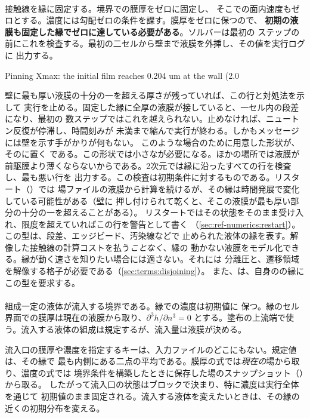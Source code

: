 \paragraph{} 接触線を縁に固定する。境界での膜厚をゼロに固定し、
そこでの面内速度もゼロとする。濃度には勾配ゼロの条件を課す。膜厚をゼロに保つので、
\textbf{初期の液膜も固定した縁でゼロに達している必要がある}。ソルバーは最初の
ステップの前にこれを検査する。最初の二セルから壁まで液膜を外挿し、その値を実行ログに
出力する。
\begin{plain}
Pinning Xmax: the initial film reaches 0.204 um at the wall (2.0 %
\end{plain}
壁に最も厚い液膜の十分の一を超える厚さが残っていれば、この行と対処法を示して
実行を止める。固定した縁に全厚の液膜が接していると、一セル内の段差になり、最初の
数ステップではこれを越えられない。止めなければ、ニュートン反復が停滞し、時間刻みが
未満まで縮んで実行が終わる。しかもメッセージには壁を示す手がかりが何もない。
このような場合のために用意した形状が、そのに置く
である。この形状では小さなが必要になる。ほかの場所では液膜が
前駆膜より薄くならないからである。2次元では縁に沿ったすべての行を検査し、最も悪い行を
出力する。この検査は初期条件に対するものである。リスタート（）では
場ファイルの液膜から計算を続けるが、その縁は時間発展で変化している可能性がある（壁に
押し付けられて乾くと、そこの液膜が最も厚い部分の十分の一を超えることがある）。
リスタートではその状態をそのまま受け入れ、限度を超えていればこの行を警告として書く
（\cref{sec:ref-numerics:restart}）。この型は、段差、エッジビード、汚染線などで
止められた液体の縁を表す。解像した接触線の計算コストを払う\emph{ことなく}、縁の
動かない液膜をモデル化できる。縁が動く速さを知りたい場合には適さない。それには
分離圧と、遷移領域を解像する格子が必要である（\cref{sec:terms:disjoining}）。
また、は、自身のの縁にこの型を要求する。

\paragraph{} 組成一定の液体が流入する境界である。縁での濃度は初期値に
保つ。縁のセル界面での膜厚は現在の液膜から取り、$\partial^3 h/\partial n^3 = 0$
とする。塗布の上流端で使う。流入する液体の組成は規定するが、流入量は液膜が決める。

\begin{note}
  流入口の膜厚や濃度を指定するキーは、入力ファイルのどこにもない。規定値は、その縁で
  最も内側にある二点の平均である。膜厚の式では\emph{現在の}場から取り、濃度の式では
  境界条件を構築したときに保存した場のスナップショット（）から取る。
  したがって流入口の状態はブロックで決まり、特に濃度は実行全体を通じて
  初期値のまま固定される。流入する液体を変えたいときは、その縁の近くの初期分布を変える。
\end{note}

